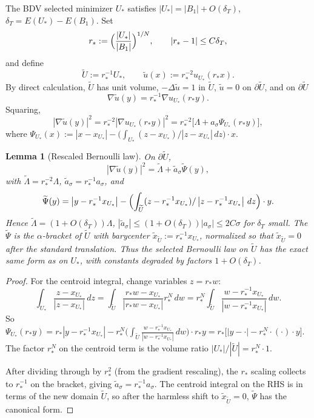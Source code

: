 \documentclass[11pt]{article}
\newtheorem{lemma}[theorem]{Lemma}
\theoremstyle{definition}
\newcommand{\abs}[1]{\left|#1\right|}
\renewcommand{\d}{\,d}
\begin{document}
The BDV selected minimizer $U_*$ satisfies $\abs{U_*}=\abs{B_1}+O(\delta_T)$,
$\delta_T=E(U_*)-E(B_1)$. Set
\[
r_*:=\Bigl(\frac{\abs{U_*}}{\abs{B_1}}\Bigr)^{1/N},\qquad
\abs{r_*-1}\le C\delta_T,
\]
and define
\[
\widetilde U:=r_*^{-1}U_*,\qquad
\widetilde u(x):=r_*^{-2}u_{U_*}(r_*x).
\]
By direct calculation, $\widetilde U$ has unit volume,
$-\Delta\widetilde u=1$ in $\widetilde U$, $\widetilde u=0$ on
$\partial\widetilde U$, and on $\partial\widetilde U$
\[
\nabla\widetilde u(y)=r_*^{-1}\nabla u_{U_*}(r_*y).
\]
Squaring,
\[
\abs{\nabla\widetilde u(y)}^2=r_*^{-2}\abs{\nabla u_{U_*}(r_*y)}^2
=r_*^{-2}\bigl[\Lambda+a_\sigma\Psi_{U_*}(r_*y)\bigr],
\]
where $\Psi_{U_*}(x):=\abs{x-x_{U_*}}-\bigl(\int_{U_*}(z-x_{U_*})/\abs{z-x_{U_*}}\d z\bigr)\cdot x$.

\begin{lemma}[Rescaled Bernoulli law]\label{lem:rescale}
On $\partial\widetilde U$,
\[
\abs{\nabla\widetilde u(y)}^2=\widetilde\Lambda+\widetilde a_\sigma\widetilde\Psi(y),
\]
with $\widetilde\Lambda=r_*^{-2}\Lambda$, $\widetilde a_\sigma=r_*^{-1}a_\sigma$,
and
\[
\widetilde\Psi(y)=\abs{y-r_*^{-1}x_{U_*}}-\Bigl(\int_{\widetilde U}(z-r_*^{-1}x_{U_*})/\abs{z-r_*^{-1}x_{U_*}}\d z\Bigr)\cdot y.
\]
Hence $\widetilde\Lambda=(1+O(\delta_T))\Lambda$, $\abs{\widetilde a_\sigma}\le(1+O(\delta_T))\abs{a_\sigma}\le 2C\sigma$ for $\delta_T$ small. The
$\widetilde\Psi$ is the $\alpha$-bracket of $\widetilde U$ with barycenter
$\widetilde{x}_{\widetilde U}:=r_*^{-1}x_{U_*}$, normalized so that
$\widetilde{x}_{\widetilde U}=0$ after the standard translation. Thus the
selected Bernoulli law on $\widetilde U$ has the exact same form as on $U_*$,
with constants degraded by factors $1+O(\delta_T)$.
\end{lemma}

\begin{proof}
For the centroid integral, change variables $z=r_* w$:
\[
\int_{U_*}\frac{z-x_{U_*}}{\abs{z-x_{U_*}}}\d z
=\int_{\widetilde U}\frac{r_*w-x_{U_*}}{\abs{r_*w-x_{U_*}}}r_*^N\d w
=r_*^N\int_{\widetilde U}\frac{w-r_*^{-1}x_{U_*}}{\abs{w-r_*^{-1}x_{U_*}}}\d w.
\]
So $\Psi_{U_*}(r_*y)=r_*\abs{y-r_*^{-1}x_{U_*}}-r_*^N\bigl(\int_{\widetilde U}\frac{w-r_*^{-1}x_{U_*}}{\abs{w-r_*^{-1}x_{U_*}}}\d w\bigr)\cdot r_*y
=r_*\bigl[\abs{y-\cdot}-r_*^N\cdot(\cdot)\cdot y\bigr]$. The factor $r_*^N$ on the
centroid term is the volume ratio $\abs{U_*}/\abs{\widetilde U}=r_*^N\cdot 1$.

After dividing through by $r_*^2$ (from the gradient rescaling), the
$r_*$ scaling collects to $r_*^{-1}$ on the bracket, giving
$\widetilde a_\sigma=r_*^{-1}a_\sigma$. The centroid integral on the
RHS is in terms of the new domain $\widetilde U$, so after the harmless
shift to $\widetilde{x}_{\widetilde U}=0$, $\widetilde\Psi$ has the
canonical form.
\end{proof}
\end{document}
